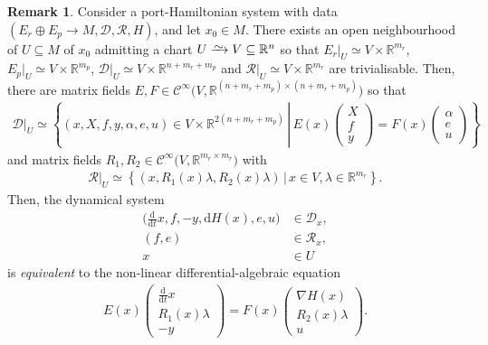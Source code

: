 \documentclass[preprint,12pt]{elsarticle}
\theoremstyle{definition}
\newtheorem{remark}[theorem]{Remark}
\newcommand{\set}[1]{\left\lbrace #1\right\rbrace}
\newcommand{\simto}{\xrightarrow{\raisebox{-0.7ex}[0ex][0ex]{$\sim$}}} %
\begin{document}
\begin{remark}
Consider a port-Hamiltonian system with data $(E_r\oplus E_p\to M,\mathcal{D},\mathcal{R},H)$, and let $x_0\in M$. There exists an open neighbourhood of $U\subseteq M$ of $x_0$ admitting a chart $U\simto V\subseteq\mathbb{R}^n$ so that $E_r\vert_U\simeq V\times\mathbb{R}^{m_r}$, $E_p\vert_U\simeq V\times\mathbb{R}^{m_p}$, $\mathcal{D}\vert_U\simeq V\times\mathbb{R}^{n+m_r+m_p}$ and $\mathcal{R}\vert_U\simeq V\times\mathbb{R}^{m_r}$ are trivialisable. Then, there are matrix fields $E,F\in\mathcal{C}^\infty\big(V,\mathbb{R}^{(n+m_r+m_p)\times(n+m_r+m_p)}\big)$ so that
\begin{align*}
\mathcal{D}\vert_U\simeq \set{(x,X,f,y,\alpha,e,u)\in V\times\mathbb{R}^{2(n+m_r+m_p)}\,\left\vert\,E(x)\begin{pmatrix}
X\\f\\y
\end{pmatrix} = F(x)\begin{pmatrix}
\alpha\\e\\u
\end{pmatrix}\right.}
\end{align*}
and matrix fields $R_1,R_2\in\mathcal{C}^\infty\big(V,\mathbb{R}^{m_r\times m_r}\big)$ with
\begin{align*}
\mathcal{R}\vert_U\simeq\set{(x,R_1(x)\lambda,R_2(x)\lambda)\,\big\vert\,x\in V,\lambda\in\mathbb{R}^{m_r}}.
\end{align*}
Then, the dynamical system
\begin{equation*}
\begin{aligned}
\big(\tfrac{\mathrm{d}}{\mathrm{d}t}x,f,-y,\mathrm{d}H(x),e,u\big) & \in\mathcal{D}_x,\\
(f,e) & \in\mathcal{R}_x,\\
x & \in U
\end{aligned}
\end{equation*}
is \textit{equivalent} to the non-linear differential-algebraic equation
\begin{align}\label{eq:local_pHs}
E(x)\begin{pmatrix}
\tfrac{\mathrm{d}}{\mathrm{d}t}x\\R_1(x)\lambda\\-y
\end{pmatrix} = F(x)\begin{pmatrix}
\nabla H(x)\\R_2(x)\lambda\\u
\end{pmatrix}.

\end{align}
\end{remark}
\end{document}
